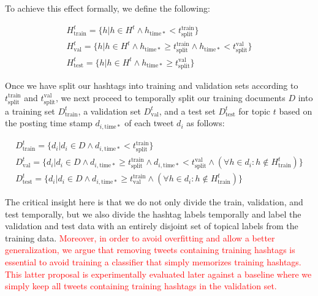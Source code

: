 \noindent To achieve this effect formally, we define the following:

\[
\begin{array}{l}
H_{\mathrm{train}}^{t}=\{h|h\in H^{t}\land h_{\mathrm{time*}}<t_{\mathrm{split}}^{\mathrm{train}}\}\\
H_{\mathrm{val}}^{t}=\{h|h\in H^{t}\land h_{\mathrm{time*}}\geq t_{\mathrm{split}}^{\mathrm{train}}\land h_{\mathrm{time*}}<t_{\mathrm{split}}^{\mathrm{val}}\}\\
H_{\mathrm{test}}^{t}=\{h|h\in H^{t}\land h_{\mathrm{time*}}\geq t_{\mathrm{split}}^{\mathrm{val}}\}
\end{array}
\]


Once we have split our hashtags into training and validation sets
according to $t^\mathrm{train}_\mathrm{split}$ and $t^\mathrm{val}_\mathrm{split}$, we next proceed to temporally split
our training documents $D$ into a training set $D^t_\mathrm{train}$, a validation set
$D^t_\mathrm{val}$, and a test set $D^t_\mathrm{test}$ for topic $t$ based on the posting
time stamp $d_{i,\mathrm{time*}}$ of each tweet $d_i$ as follows: 


\[
\begin{array}{l}
D_{\mathrm{train}}^{t}=\{d_{i}|d_{i}\in D\land d_{i,\mathrm{time*}}<t_{\mathrm{split}}^{\mathrm{train}}\}\\
D_{\mathrm{val}}^{t}=\{d_{i}|d_{i}\in D\land d_{i,\mathrm{time*}}\geq t_{\mathrm{split}}^{\mathrm{train}}\land d_{i,\mathrm{time*}}<t_{\mathrm{split}}^{\mathrm{val}}\land(\forall h\in d_{i}:h\notin H_{\mathrm{train}}^{t})\}\\
D_{\mathrm{test}}^{t}=\{d_{i}|d_{i}\in D\land d_{i,\mathrm{time*}}\geq t_{\mathrm{val}}^{\mathrm{train}}\land(\forall h\in d_{i}:h\notin H_{\mathrm{train}}^{t})\}
\end{array}
\]




The critical insight here is that we do not only divide the train, validation, and test
temporally, but we also divide the hashtag labels temporally and label the validation and test
data with an entirely disjoint set of topical labels from the training data. \textcolor{red}{Moreover, in order to avoid overfitting and allow a better generalization, we argue that removing tweets containing training hashtags is essential to avoid training a classifier that simply memorizes training hashtags. This latter proposal is experimentally evaluated later against a baseline where we simply keep all tweets containing training hashtags in the validation set.}
 




